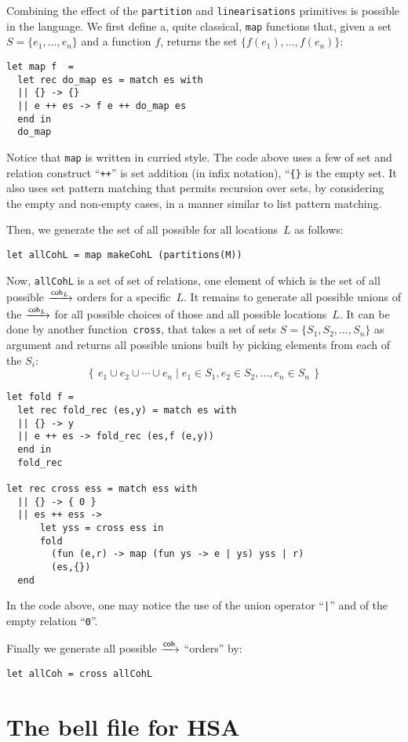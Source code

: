 \documentclass[a4paper]{article}
\begin{document}
Combining the effect of the \texttt{partition} and \texttt{linearisations}
primitives is possible in the \cat{} language.
We first define a, quite classical,
\texttt{map} functions that, given a set~$S= \{e_1,\ldots,e_n\}$
and a function $f$, returns the set $\{f(e_1),\ldots,f(e_n)\}$:
\begin{verbatim}
let map f  =
  let rec do_map es = match es with
  || {} -> {}
  || e ++ es -> f e ++ do_map es
  end in
  do_map
\end{verbatim}
Notice that \texttt{map} is written in curried style.
The code above uses a few of \cat{} set and relation construct
``\texttt{++}'' is set addition (in infix notation),
``\verb+{}+ is the empty set.
It also uses set pattern matching that permits recursion over sets,
by considering the empty and non-empty cases, in a manner similar
to list pattern matching.

Then, we generate the set of all possible  for all locations~$L$ as
follows:
\begin{verbatim}
let allCohL = map makeCohL (partitions(M))
\end{verbatim}

Now, \texttt{allCohL} is a set of set of relations, one element of which
is the set of all possible $\xrightarrow{\textsf{\scriptsize{}coh$_{L}$}}$ orders for a specific~$L$.
It remains to generate all possible unions of the $\xrightarrow{\textsf{\scriptsize{}coh$_{L}$}}$ for
all possible choices of those and all possible locations~$L$.
It can be done by another \cat{} function~\texttt{cross}, that takes
a set of sets $S = \{S_1, S_2, \ldots, S_n\}$
as argument and returns all possible unions
built by picking elements from each of the $S_i$:
$$
\left\{\, e_1 \cup e_2 \cup \cdots \cup e_n \mid
e_1 \in S_1, e_2 \in S_2, \ldots, e_n \in S_n \,\right\}
$$
\begin{verbatim}
let fold f =
  let rec fold_rec (es,y) = match es with
  || {} -> y
  || e ++ es -> fold_rec (es,f (e,y))
  end in
  fold_rec

let rec cross ess = match ess with
  || {} -> { 0 }
  || es ++ ess ->
      let yss = cross ess in
      fold
        (fun (e,r) -> map (fun ys -> e | ys) yss | r)
        (es,{})           
  end      
\end{verbatim}
In the code above,
one may notice the use of the union operator ``\verb+|+''
and of the empty relation ``\verb+0+''.

Finally we generate all possible $\xrightarrow{\textsf{\scriptsize{}coh}}$ ``orders'' by:
\begin{verbatim}
let allCoh = cross allCohL
\end{verbatim}

\section{\label{bell}The bell file for HSA}
\end{document}
